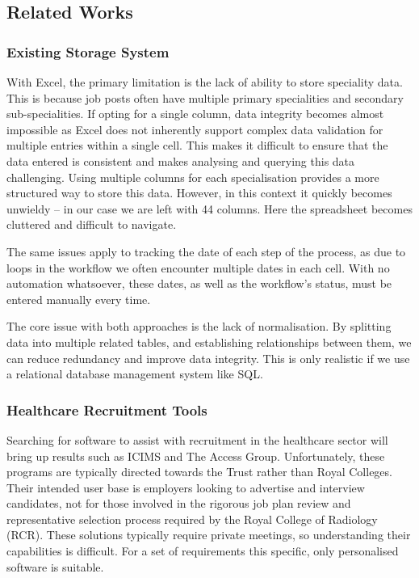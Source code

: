\subsection{Related Works}
\subsubsection{Existing Storage System}
With Excel, the primary limitation is the lack of ability to store speciality data. This is because job posts often have multiple primary specialities and secondary sub-specialities. If opting for a single column, data integrity becomes almost impossible as Excel does not inherently support complex data validation for multiple entries within a single cell. This makes it difficult to ensure that the data entered is consistent and makes analysing and querying this data challenging. Using multiple columns for each specialisation provides a more structured way to store this data. However, in this context it quickly becomes unwieldy – in our case we are left with 44 columns. Here the spreadsheet becomes cluttered and difficult to navigate.

The same issues apply to tracking the date of each step of the process, as due to loops in the workflow we often encounter multiple dates in each cell. With no automation whatsoever, these dates, as well as the workflow’s status, must be entered manually every time.

The core issue with both approaches is the lack of normalisation. By splitting data into multiple related tables, and establishing relationships between them, we can reduce redundancy and improve data integrity. This is only realistic if we use a relational database management system like SQL.
\subsubsection{Healthcare Recruitment Tools}
Searching for software to assist with recruitment in the healthcare sector will bring up results such as ICIMS and The Access Group. Unfortunately, these programs are typically directed towards the Trust rather than Royal Colleges. Their intended user base is employers looking to advertise and interview candidates, not for those involved in the rigorous job plan review and representative selection process required by the Royal College of Radiology (RCR). These solutions typically require private meetings, so understanding their capabilities is difficult. For a set of requirements this specific, only personalised software is suitable.
